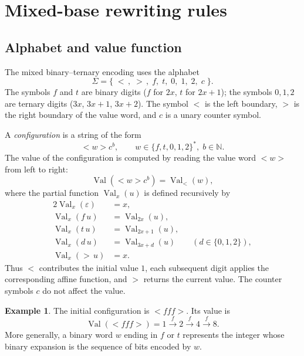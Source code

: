 \documentclass[11pt,a4paper]{article}
\theoremstyle{definition}
\newtheorem{example}[definition]{Example}
\newcommand{\lt}{<}
\newcommand{\gt}{>}
\newcommand{\Nat}{\mathbb{N}}
\newcommand{\val}{\operatorname{Val}}
\begin{document}
\section{Mixed-base rewriting rules}
\label{sec:rewriting}

\subsection{Alphabet and value function}
\label{subsec:alphabet}

The mixed binary--ternary encoding uses the alphabet
\[
  \Sigma=\{\;\lt\, ,\; \gt\, ,\; f,\; t,\; 0,\; 1,\; 2,\; c\;\}.
\]
The symbols $f$ and $t$ are binary digits ($f$ for $2x$, $t$ for
$2x+1$); the symbols $0,1,2$ are ternary digits ($3x$, $3x+1$,
$3x+2$).  The symbol $\lt$ is the left boundary, $\gt$ is the right
boundary of the value word, and $c$ is a unary counter symbol.

A \emph{configuration} is a string of the form
\begin{equation}
  \label{eq:config}
  \lt w\gt c^{b},
  \qquad w\in\{f,t,0,1,2\}^{*},\; b\in\Nat.
\end{equation}
The value of the configuration is computed by reading the value word
$\lt w\gt$ from left to right:
\begin{equation}
  \label{eq:val}
  \val(\lt w\gt c^{b})
  =
  \val_{\lt}(w),
\end{equation}
where the partial function $\val_{x}(u)$ is defined recursively by
\begin{alignat}{2}
  \val_{x}(\varepsilon) &= x,\nonumber\\
  \val_{x}(f\,u) &= \val_{2x}(u),\nonumber\\
  \val_{x}(t\,u) &= \val_{2x+1}(u),\nonumber\\
  \val_{x}(d\,u) &= \val_{3x+d}(u)\qquad (d\in\{0,1,2\}),\nonumber\\
  \val_{x}(\gt\,u) &= x.\label{eq:val-rec}
\end{alignat}
Thus $\lt$ contributes the initial value $1$, each subsequent digit
applies the corresponding affine function, and $\gt$ returns the
current value.  The counter symbols $c$ do not affect the value.

\begin{example}
  The initial configuration is $\lt fff\gt$.  Its value is
  \[
    \val(\lt fff\gt)
    = 1\xrightarrow{f}2\xrightarrow{f}4\xrightarrow{f}8.
  \]
  More generally, a binary word $w$ ending in $f$ or $t$ represents the
  integer whose binary expansion is the sequence of bits encoded by
  $w$.
\end{example}
\end{document}
